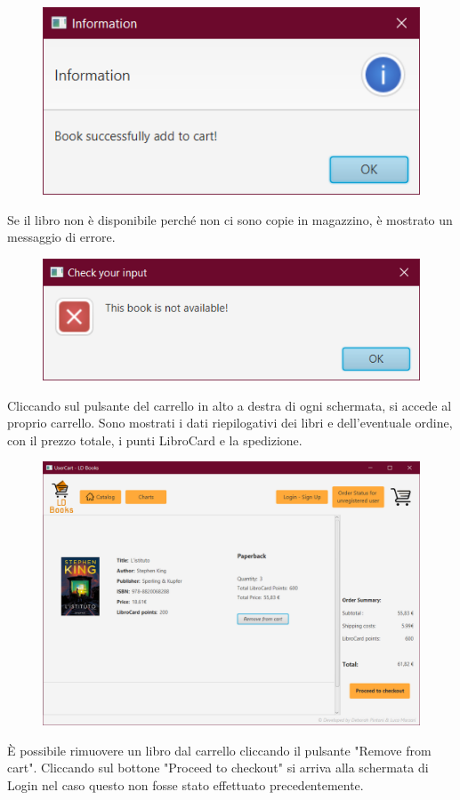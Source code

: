 \documentclass[a4paper,11pt]{report}
\begin{document}
\begin{figure}[h!]
	\centering
	\includegraphics[width=0.5\linewidth]{Screenshots/libroAggiuntoCarrello.png}
\end{figure}

Se il libro non è disponibile perché non ci sono copie in magazzino, è mostrato un messaggio di errore.

\begin{figure}[h!]
	\centering
	\includegraphics[width=0.5\linewidth]{Screenshots/libroNonDisp.png}
\end{figure}

Cliccando sul pulsante del carrello in alto a destra di ogni schermata, si accede al proprio carrello. Sono mostrati i dati riepilogativi dei libri e dell'eventuale ordine, con il prezzo totale, i punti LibroCard e la spedizione.
\newpage

\begin{figure}[h!]
	\centering
	\includegraphics[width=0.8\linewidth]{Screenshots/carrello.png}
\end{figure}

È possibile rimuovere un libro dal carrello cliccando il pulsante "Remove from cart". Cliccando sul bottone "Proceed to checkout" si arriva alla schermata di Login nel caso questo non fosse stato effettuato precedentemente.
\end{document}
